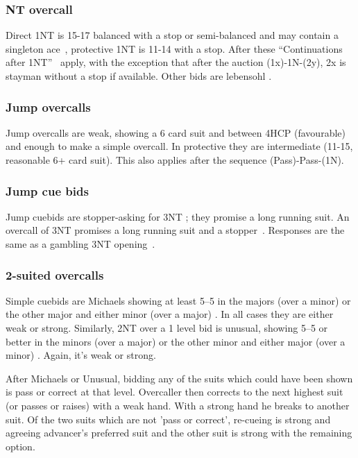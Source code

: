 \documentclass[a4paper,14pt]{extarticle}
\begin{document}
\subsubsection{NT overcall}
Direct 1NT is 15-17 balanced with a stop or semi-balanced and may contain a
singleton ace~, protective 1NT is 11-14 with a stop.  After these
``Continuations after 1NT''~ apply, with the exception that
after the auction (1x)-1N-(2y), 2x is stayman without a stop if available.
Other bids are lebensohl .

\subsubsection{Jump overcalls}
Jump overcalls are weak, showing a 6 card suit and between 4HCP (favourable)
and enough to make a simple overcall. In protective they are intermediate
(11-15, reasonable 6+ card suit). This also applies after the sequence (Pass)-Pass-(1N).

\subsubsection{Jump cue bids}
Jump cuebids are stopper-asking for 3NT ; they promise a long
running suit.  An overcall of 3NT promises a long running suit and a stopper~.
Responses are the same as a gambling 3NT opening~.

\subsubsection{2-suited overcalls}

Simple cuebids are Michaels showing at least 5--5 in the majors (over a minor)
or the other major and either minor (over a major) . In all cases they are
either weak or strong. Similarly, 2NT over a 1 level bid is unusual, showing
5--5 or better in the minors (over a major) or the other minor and either major
(over a minor) . Again, it's weak or strong.

After Michaels or Unusual, bidding any of the suits which could have been shown
is pass or correct at that level. Overcaller then corrects to the next highest
suit (or passes or raises) with a weak hand. With a strong hand he breaks to
another suit. Of the two suits which are not 'pass or correct', re-cueing is
strong and agreeing advancer's preferred suit and the other suit is strong with
the remaining option.
\end{document}
